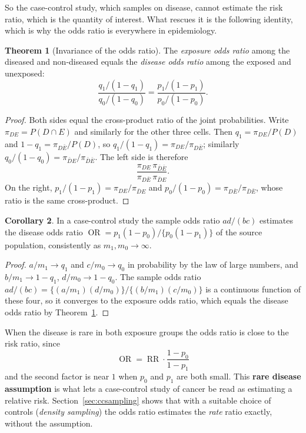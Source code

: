 \documentclass[11pt,a4paper]{article}
\numberwithin{equation}{section}
\DeclareMathOperator{\OR}{OR}
\DeclareMathOperator{\RR}{RR}
\theoremstyle{definition}
\newtheorem{thm}{Theorem}[subsection]
\newtheorem{coro}[thm]{Corollary}
\begin{document}
So the case-control study, which samples on disease, cannot estimate the risk ratio, which is the quantity of interest. What rescues it is
the following identity, which is why the odds ratio is everywhere in epidemiology.

\begin{thm}[Invariance of the odds ratio]
\label{thm:orinv}
The \emph{exposure odds ratio} among the diseased and non-diseased equals the \emph{disease odds ratio} among the exposed and unexposed:
\[
\frac{q_1/(1 - q_1)}{q_0/(1 - q_0)} = \frac{p_1/(1 - p_1)}{p_0/(1 - p_0)} .
\]
\end{thm}

\begin{proof}
Both sides equal the cross-product ratio of the joint probabilities. Write $\pi_{DE} = P(D \cap E)$ and similarly for the other three cells.
Then $q_1 = \pi_{DE}/P(D)$ and $1 - q_1 = \pi_{D\bar E}/P(D)$, so $q_1/(1 - q_1) = \pi_{DE}/\pi_{D\bar E}$; similarly $q_0/(1 - q_0) = \pi_{\bar D E}/\pi_{\bar D \bar E}$. The
left side is therefore
\[
\frac{\pi_{DE}\,\pi_{\bar D \bar E}}{\pi_{D\bar E}\,\pi_{\bar D E}} .
\]
On the right, $p_1/(1 - p_1) = \pi_{DE}/\pi_{\bar D E}$ and $p_0/(1 - p_0) = \pi_{D\bar E}/\pi_{\bar D \bar E}$, whose ratio is the same cross-product.
\end{proof}

\begin{coro}
In a case-control study the sample odds ratio $ad/(bc)$ estimates the disease odds ratio $\OR = p_1(1 - p_0)/\{p_0(1 - p_1)\}$ of the source
population, consistently as $m_1, m_0 \to \infty$.
\end{coro}

\begin{proof}
$a/m_1 \to q_1$ and $c/m_0 \to q_0$ in probability by the law of large numbers, and $b/m_1 \to 1 - q_1$, $d/m_0 \to 1 - q_0$. The sample odds ratio
$ad/(bc) = \{(a/m_1)(d/m_0)\}/\{(b/m_1)(c/m_0)\}$ is a continuous function of these four, so it converges to the exposure odds ratio, which equals the
disease odds ratio by Theorem~\ref{thm:orinv}.
\end{proof}

When the disease is rare in both exposure groups the odds ratio is close to the risk ratio, since
\[
\OR = \RR \cdot \frac{1 - p_0}{1 - p_1}
\]
and the second factor is near $1$ when $p_0$ and $p_1$ are both small. This \textbf{rare disease assumption} is what lets a case-control
study of cancer be read as estimating a relative risk. Section~\ref{sec:ccsampling} shows that with a suitable choice of controls
(\emph{density sampling}) the odds ratio estimates the \emph{rate} ratio exactly, without the assumption.
\end{document}
